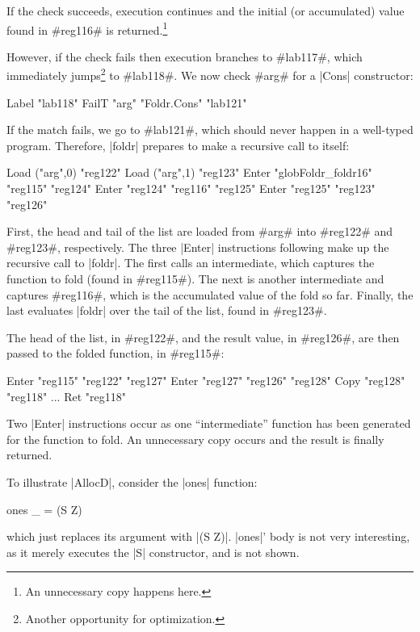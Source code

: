 \documentclass[11pt]{article}
\begin{document}
\noindent
If the check succeeds, execution continues and the initial (or
accumulated) value found in #reg116# is returned.\footnote{An
  unnecessary copy happens here.} 

However, if the check fails then execution branches to #lab117#, which
immediately jumps\footnote{Another opportunity for
  optimization.} to #lab118#. We now check #arg# for a |Cons|
constructor:

\begin{code}
  Label "lab118"
  FailT "arg" "Foldr.Cons" "lab121"
\end{code}

\noindent
If the match fails, we go to #lab121#, which should never happen in a
well-typed program. Therefore, |foldr| prepares to make a recursive
call to itself:

\begin{code}
  Load ("arg",0) "reg122"
  Load ("arg",1) "reg123"
  Enter "globFoldr_foldr16" "reg115" "reg124"
  Enter "reg124" "reg116" "reg125"
  Enter "reg125" "reg123" "reg126"
\end{code}

\noindent
First, the head and tail of the list are loaded from #arg#
 into #reg122# and #reg123#, respectively. The three |Enter|
instructions following make up the recursive call to |foldr|. The
first calls an intermediate, which captures the function to fold
(found in #reg115#). The next is another intermediate and captures
#reg116#, which is the accumulated value of the fold so far. Finally,
the last evaluates |foldr| over the tail of the list, found in
#reg123#. 

The head of the list, in #reg122#, and the result value, in #reg126#, 
are then passed to the folded function, in #reg115#:

\begin{code}
  Enter "reg115" "reg122" "reg127"
  Enter "reg127" "reg126" "reg128"
  Copy "reg128" "reg118"
  ...
  Ret "reg118"
\end{code}

\noindent
Two |Enter| instructions occur as one ``intermediate'' function has
been generated for the function to fold. An unnecessary copy occurs
and the result is finally returned.

To illustrate |AllocD|, consider the |ones| function:

\begin{code}
ones _ = (S Z)
\end{code}

\noindent
which just replaces its argument with |(S Z)|. |ones|' body is not
very interesting, as it merely executes the |S| constructor, and is
not shown. 
\end{document}
